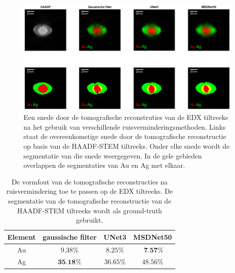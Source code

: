 \documentclass{report}
\begin{document}
\begin{figure}[h!]
	\centering
	\includegraphics[width=15cm]{images/tomo/auag.png}
	\caption{Een snede door de tomografische reconstruties van de EDX tiltreeks na het gebruik van verschillende ruisverminderingsmethoden. Links staat de overeenkomstige snede door de tomografische reconstructie op basis van de HAADF-STEM tiltreeks. Onder elke snede wordt de segmentatie van die snede weergegeven. In de gele gebieden overlappen de segmentaties van Au en Ag met elkaar.}
	\label{fig:tomo_auag}
\end{figure}
\begin{table}[h!]
	\centering
	\caption{De vormfout van de tomografische reconstructies na ruisvermindering toe te passen op de EDX tiltreeks. De segmentatie van de tomografische reconstructie van de HAADF-STEM tiltreeks wordt als ground-truth gebruikt.}
	\begin{tabular}{|c|ccc|}
		\hline
		Element & gaussische filter & UNet3 & MSDNet50 \\
		\hline
		Au & $ 9.38\%$ & $ 8.25\%$ & $\textbf{ 7.57}\%$ \\
		Ag & $\textbf{35.18}\%$ & $36.65\%$ & $48.56\%$ \\
		\hline
	\end{tabular}
	\label{tab:tomo_auag}
\end{table}

\newpage
\end{document}
